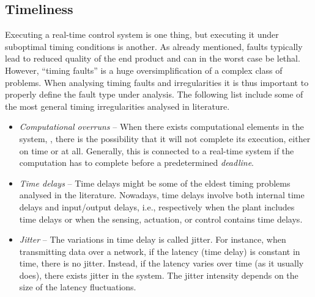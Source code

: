 \subsection{Timeliness}%
\label{sec:intro:timeliness}%
%
Executing a real-time control system is one thing, but executing it under suboptimal timing conditions is another.
As already mentioned, faults typically lead to reduced quality of the end product and can in the worst case be lethal.
However, ``timing faults'' is a huge oversimplification of a complex class of problems.
When analysing timing faults and irregularities it is thus important to properly define the fault type under analysis.
The following list include some of the most general timing irregularities analysed in literature.
%
\begin{itemize}
    \item \emph{Computational overruns} -- When there exists computational elements in the system, , there is the possibility that it will not complete its execution, either on time or at all. %
        Generally, this is connected to a real-time system if the computation has to complete before a predetermined \emph{deadline}.

    \item \emph{Time delays} -- Time delays might be some of the eldest timing problems analysed in the literature.
        Nowadays, time delays involve both internal time delays and input/output delays, i.e., respectively when the plant includes time delays or when the sensing, actuation, or control contains time delays. 

    \item \emph{Jitter} -- The variations in time delay is called jitter. 
        For instance, when transmitting data over a network, if the latency (time delay) is constant in time, there is no jitter.
        Instead, if the latency varies over time (as it usually does), there exists jitter in the system.
        The jitter intensity depends on the size of the latency fluctuations.


\end{itemize}

